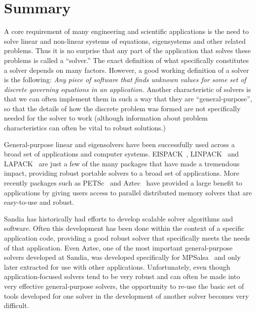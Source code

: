 \documentclass[12pt,relax]{SANDreport}
\begin{document}


    \clearpage
    \section{Summary}

A core requirement of many engineering and scientific applications is the need to solve linear and non-linear 
systems of equations, eigensystems and other related problems.  Thus it is no surprise that any 
part of the application that solves these problems is called a ``solver.'' The exact definition of what
specifically constitutes a solver depends on many factors.  However, a good working definition of a solver is
the following: {\it Any piece of software that finds unknown values for some set of discrete
governing equations in 
an application.}  Another characteristic of solvers is that we can often implement them in such a way that they
are ``general-purpose'', so that the
details of how the discrete problem was formed are not specifically needed for the solver to work (although
information about problem characteristics can often be vital to robust solutions.)

General-purpose linear and eigensolvers have been successfully used across a broad set of applications and 
computer systems.  EISPACK~\cite{eispack}, LINPACK~\cite{linpack} and LAPACK~\cite{lapack} are just a few of
the many packages that have made a tremendous impact, providing robust portable solvers to a broad set of 
applications.  More recently packages such as PETSc~\cite{petsc-home-page,petsc-manual,petsc-efficient} 
and Aztec~\cite{Aztec2.1} have provided a large
benefit to applications by giving users access to parallel distributed memory solvers that are easy-to-use and
robust.

Sandia has historically had efforts to develop scalable solver algorithms and software.  Often this
development has been done within the context of a specific application code, providing a good robust solver
that specifically meets the needs of that application.  Even Aztec, one of the most important general-purpose
solvers developed at Sandia, was developed specifically for MPSalsa~\cite{MPSalsa-User-Guide,MPSalsa-Theory} 
and only later extracted 
for use with other applications.  Unfortunately, even though application-focused solvers 
tend to be very robust and can often be made into very effective general-purpose solvers, the opportunity
to re-use the basic set of tools developed for one solver in the development of another solver becomes very
difficult.
\end{document}
